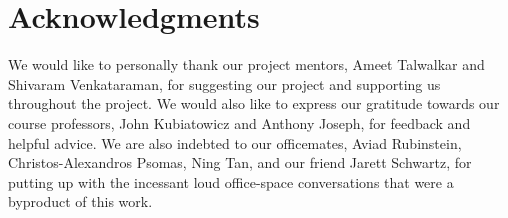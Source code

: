 \documentclass{acm_proc_article-sp}
\begin{document}
\section{Acknowledgments}
We would like to personally thank our project mentors, Ameet Talwalkar and
Shivaram Venkataraman, for suggesting our project and supporting us
throughout the project. We would also like to express our gratitude 
towards our course professors,
John Kubiatowicz and Anthony Joseph, for feedback and helpful advice. 
We are also indebted to our officemates, 
Aviad Rubinstein, 
Christos-Alexandros Psomas,
Ning Tan,
and our friend Jarett Schwartz, 
for putting up with the incessant loud office-space conversations
that were a byproduct of this work.


%

%
%

\balancecolumns
\end{document}
